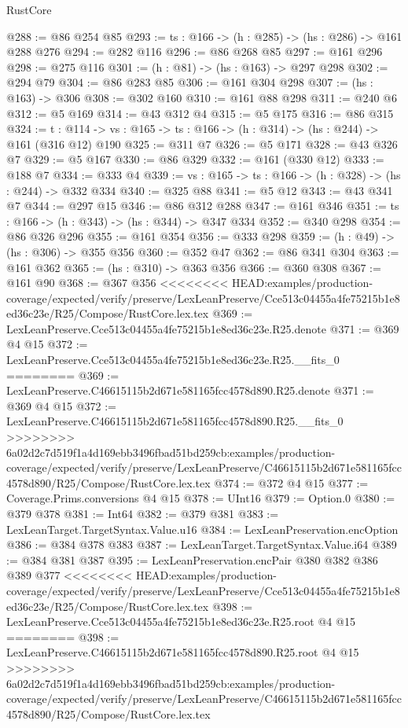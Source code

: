 \begin{lexlean}{RustCore}
\begin{coremodule}
{\begin{coremodule}
@288 := @86 @254 @85
@293 := {ts : @166} -> (h : @285) -> (hs : @286) -> @161 @288 @276
@294 := @282 @116
@296 := @86 @268 @85
@297 := @161 @296
@298 := @275 @116
@301 := (h : @81) -> (hs : @163) -> @297 @298
@302 := @294 @79
@304 := @86 @283 @85
@306 := @161 @304 @298
@307 := (hs : @163) -> @306
@308 := @302 @160
@310 := @161 @88 @298
@311 := @240 @6
@312 := @5 @169
@314 := @43 @312 @4
@315 := @5 @175
@316 := @86 @315
@324 := {t : @114} ->
  {vs : @165} -> {ts : @166} -> (h : @314) -> (hs : @244) -> @161 (@316 @12) @190
@325 := @311 @7
@326 := @5 @171
@328 := @43 @326 @7
@329 := @5 @167
@330 := @86 @329
@332 := @161 (@330 @12)
@333 := @188 @7
@334 := @333 @4
@339 := {vs : @165} -> {ts : @166} -> (h : @328) -> (hs : @244) -> @332 @334
@340 := @325 @88
@341 := @5 @12
@343 := @43 @341 @7
@344 := @297 @15
@346 := @86 @312 @288
@347 := @161 @346
@351 := {ts : @166} -> (h : @343) -> (hs : @344) -> @347 @334
@352 := @340 @298
@354 := @86 @326 @296
@355 := @161 @354
@356 := @333 @298
@359 := (h : @49) -> (hs : @306) -> @355 @356
@360 := @352 @47
@362 := @86 @341 @304
@363 := @161 @362
@365 := (hs : @310) -> @363 @356
@366 := @360 @308
@367 := @161 @90
@368 := @367 @356
<<<<<<<< HEAD:examples/production-coverage/expected/verify/preserve/LexLeanPreserve/Cce513c04455a4fe75215b1e8ed36c23e/R25/Compose/RustCore.lex.tex
@369 := LexLeanPreserve.Cce513c04455a4fe75215b1e8ed36c23e.R25.denote
@371 := @369 @4 @15
@372 := LexLeanPreserve.Cce513c04455a4fe75215b1e8ed36c23e.R25.__fits_0
========
@369 := LexLeanPreserve.C46615115b2d671e581165fcc4578d890.R25.denote
@371 := @369 @4 @15
@372 := LexLeanPreserve.C46615115b2d671e581165fcc4578d890.R25.__fits_0
>>>>>>>> 6a02d2c7d519f1a4d169ebb3496fbad51bd259cb:examples/production-coverage/expected/verify/preserve/LexLeanPreserve/C46615115b2d671e581165fcc4578d890/R25/Compose/RustCore.lex.tex
@374 := @372 @4 @15
@377 := Coverage.Prims.conversions @4 @15
@378 := UInt16
@379 := Option.{0}
@380 := @379 @378
@381 := Int64
@382 := @379 @381
@383 := LexLeanTarget.TargetSyntax.Value.u16
@384 := LexLeanPreservation.encOption
@386 := @384 @378 @383
@387 := LexLeanTarget.TargetSyntax.Value.i64
@389 := @384 @381 @387
@395 := LexLeanPreservation.encPair @380 @382 @386 @389 @377
<<<<<<<< HEAD:examples/production-coverage/expected/verify/preserve/LexLeanPreserve/Cce513c04455a4fe75215b1e8ed36c23e/R25/Compose/RustCore.lex.tex
@398 := LexLeanPreserve.Cce513c04455a4fe75215b1e8ed36c23e.R25.root @4 @15
========
@398 := LexLeanPreserve.C46615115b2d671e581165fcc4578d890.R25.root @4 @15
>>>>>>>> 6a02d2c7d519f1a4d169ebb3496fbad51bd259cb:examples/production-coverage/expected/verify/preserve/LexLeanPreserve/C46615115b2d671e581165fcc4578d890/R25/Compose/RustCore.lex.tex

\end{coremodule}}
\end{coremodule}
\end{lexlean}
